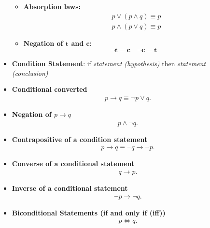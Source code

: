 \documentclass{report}
\begin{document}
\begin{itemize}
\begin{itemize}
    \item \textbf{Absorption laws:}
    \begin{align*}
        & p \lor (p \land q) \equiv p \\
        & p \land (p \lor q) \equiv p
    \end{align*}
    
    \item \textbf{Negation of $\mathbf{t}$ and $\mathbf{c}$:}
    \[
    \neg \mathbf{t} = \mathbf{c} \quad \neg \mathbf{c} = \mathbf{t}
    \]
        \end{itemize}
        \bigbreak \noindent 
      \item \textbf{Condition Statement}: if \textit{statement (hypothesis)} then \textit{statement (conclusion)}
      \bigbreak \noindent 
    \item \textbf{Conditional converted }
      \begin{align*}
        p \rightarrow q \equiv \neg p \lor q
      .\end{align*}
      \item \textbf{Negation of $p \rightarrow q$}
        \begin{align*}
          p \land \neg q
        .\end{align*}
      \item \textbf{Contrapositive of a condition statement}
        \begin{align*}
          p \rightarrow q \equiv \neg q \rightarrow \neg p
        .\end{align*}
      \item \textbf{Converse of a conditional statement}
        \begin{align*}
          q \rightarrow p
        .\end{align*}
      \item \textbf{Inverse of a conditional statement}
        \begin{align*}
          \neg p \rightarrow \neg q
        .\end{align*}
      \item \textbf{Biconditional Statements (if and only if (iff))}
        \begin{align*}
          p \iff q
        .\end{align*}
        \bigbreak \noindent 

\end{itemize}
\end{document}
